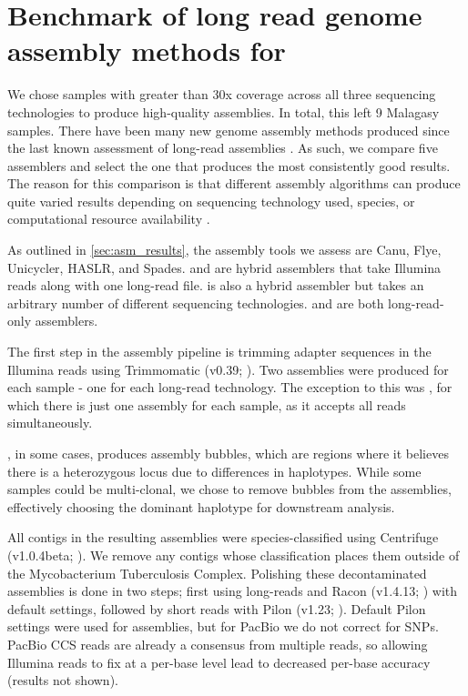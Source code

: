 
\section{Benchmark of long read genome assembly methods for \mtb{}}
\label{app:asm}
We chose samples with greater than 30x coverage across all three sequencing technologies to produce high-quality assemblies. In total, this left 9 Malagasy samples. There have been many new genome assembly methods produced since the last known assessment of \mtb{} long-read assemblies \cite{bainomugisa2018}. As such, we compare five assemblers and select the one that produces the most consistently good results. The reason for this comparison is that different assembly algorithms can produce quite varied results depending on sequencing technology used, species, or computational resource availability \cite{demaio2019,wick2020}.  

As outlined in \autoref{sec:asm_results}, the assembly tools we assess are Canu, Flye, Unicycler, HASLR, and Spades. \haslr{} and \unicycler{} are hybrid assemblers that take Illumina reads along with one long-read file. \spades{} is also a hybrid assembler but takes an arbitrary number of different sequencing technologies. \canu{} and \flye{} are both long-read-only assemblers.

The first step in the assembly pipeline is trimming adapter sequences in the Illumina reads using Trimmomatic (v0.39; \cite{bolger2014}). Two assemblies were produced for each sample - one for each long-read technology. The exception to this was \spades{}, for which there is just one assembly for each sample, as it accepts all reads simultaneously. 

\canu{}, in some cases, produces assembly bubbles, which are regions where it believes there is a heterozygous locus due to differences in haplotypes. While some samples could be multi-clonal, we chose to remove bubbles from the \canu{} assemblies, effectively choosing the dominant haplotype for downstream analysis.  

All contigs in the resulting assemblies were species-classified using Centrifuge (v1.0.4beta; \cite{kim2016}). We remove any contigs whose classification places them outside of the Mycobacterium Tuberculosis Complex. Polishing these decontaminated assemblies is done in two steps; first using long-reads and Racon (v1.4.13; \cite{vaser2017}) with default settings, followed by short reads with Pilon (v1.23; \cite{pilon2014}). Default Pilon settings were used for \ont{} assemblies, but for PacBio we do not correct for SNPs. PacBio CCS reads are already a consensus from multiple reads, so allowing Illumina reads to fix at a per-base level lead to decreased per-base accuracy (results not shown).  

